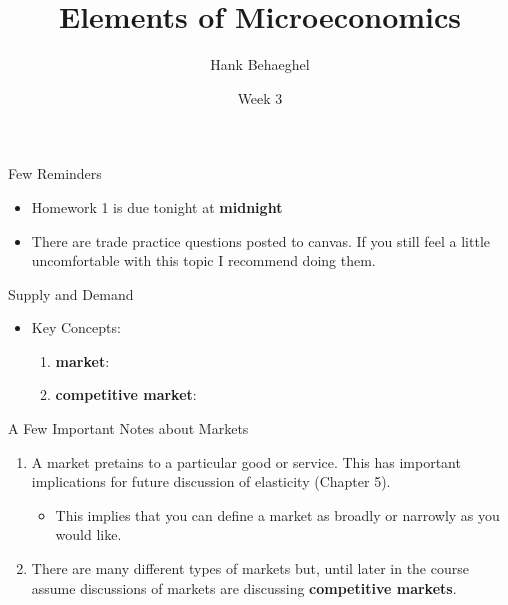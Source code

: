 \documentclass{beamer}
\title{Elements of Microeconomics}
\author{Hank Behaeghel}
\institute{Johns Hopkins University}
\date{Week 3}
\begin{document}
\maketitle

\begin{frame}{Few Reminders}
    \begin{itemize}
        \item Homework 1 is due tonight at \textbf{midnight}
        \vspace{5mm}
        \item There are trade practice questions posted to canvas. If you still feel a little uncomfortable with this topic I recommend doing them.
    \end{itemize}
\end{frame}

\begin{frame}{Supply and Demand}
    \begin{itemize}
        \item Key Concepts:
        \vspace{5mm}
        \begin{enumerate}
            \item<1-> \textbf{market}: 
            \vspace{5mm}
            \item<3-> \textbf{competitive market}: 
        \end{enumerate}
    \end{itemize}
    
\end{frame}

\begin{frame}{A Few Important Notes about Markets}
    \begin{enumerate}
        \item A market pretains to a particular good or service. This has important implications for future discussion of elasticity (Chapter 5).
        \vspace{5mm}
        \begin{itemize}
            \item This implies that you can define a market as broadly or narrowly as you would like.
        \end{itemize}
        \vspace{5mm}
        \item There are many different types of markets but, until later in the course assume discussions of markets are discussing \textbf{competitive markets}.
    \end{enumerate}
\end{frame}
\end{document}
